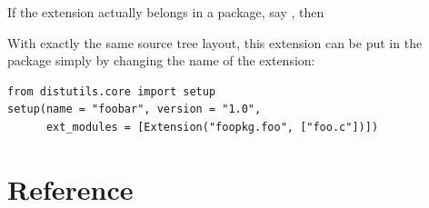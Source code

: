 \documentclass{howto}
\begin{document}
If the extension actually belongs in a package, say ,
then 

With exactly the same source tree layout, this extension can be put in
the  package simply by changing the name of the
extension:
\begin{verbatim}
from distutils.core import setup
setup(name = "foobar", version = "1.0",
      ext_modules = [Extension("foopkg.foo", ["foo.c"])])
\end{verbatim}














\section{Reference}
\label{reference}



\end{document}
